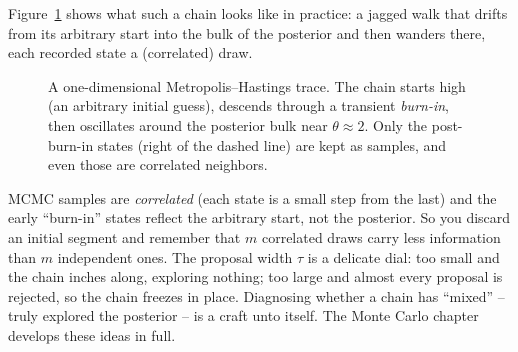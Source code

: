 Figure~\ref{ch34:fig-mcmc} shows what such a chain looks like in practice: a
jagged walk that drifts from its arbitrary start into the bulk of the posterior
and then wanders there, each recorded state a (correlated) draw.

\begin{figure}[H]
\centering
{}
\caption{A one-dimensional Metropolis--Hastings trace. The chain starts high
(an arbitrary initial guess), descends through a transient \emph{burn-in}, then
oscillates around the posterior bulk near $\theta\approx 2$. Only the
post-burn-in states (right of the dashed line) are kept as samples, and even
those are correlated neighbors.}
\label{ch34:fig-mcmc}
\end{figure}

\begin{trapbox}
MCMC samples are \emph{correlated} (each state is a small step from the last) and
the early ``burn-in'' states reflect the arbitrary start, not the posterior. So
you discard an initial segment and remember that $m$ correlated draws carry less
information than $m$ independent ones. The proposal width $\tau$ is a delicate
dial: too small and the chain inches along, exploring nothing; too large and
almost every proposal is rejected, so the chain freezes in place. Diagnosing
whether a chain has ``mixed'' -- truly explored the posterior -- is a craft unto
itself. The Monte Carlo chapter develops these ideas in full.
\end{trapbox}

